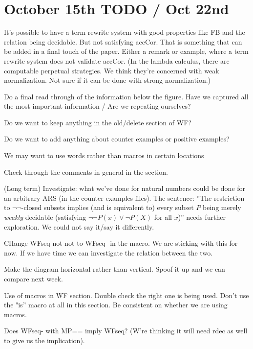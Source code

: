 \documentclass{article}
\newcommand{\cmark}{\ding{51}}%
\newcommand{\done}{\rlap{$\square$}{\raisebox{2pt}{\large\hspace{1pt}\cmark}}%
\hspace{-2.5pt}}
\begin{document}
\section*{October 15th TODO / Oct 22nd}
\begin{todolist}     
  \item It's possible to have a term rewrite system with good properties like FB and the relation being decidable. But not satisfying accCor. That is something that can be added in a final touch of the paper. Either a remark or example, where a term rewrite system does not validate accCor. (In the lambda calculus, there are computable perpetual strategies. We think they're concerned with weak normalization. Not sure if it can be done with strong normalization.)
  \item Do a final read through of the information below the figure. Have we captured all the most important information / Are we repeating ourselves?
  \item [\done] Do we want to keep anything in the old/delete section of WF?
  \item Do we want to add anything about counter examples or positive examples? 
  \item [\done] We may want to use words rather than macros in certain locations
  \item [\done] Check through the comments in general in the section. 
  \item (Long term) Investigate: what we've done for natural numbers could be done for an arbitrary ARS (in the counter examples files). The sentence: ''The restriction to $\lnot\lnot$-closed subsets implies (and is equivalent to) 
every subset $P$ being merely \emph{weakly} decidable (satisfying $\lnot \lnot P(x) \lor \lnot P(X)$ 
for all $x$)'' needs further exploration. We could not say it/say it differently. 
\item [\done]  CHange WFseq not not to WFseq- in the macro. We are sticking with this for now. If we have time we can investigate the relation between the two.
\item [\done]  Make the diagram horizontal rather than vertical. Spoof it up and we can compare next week.
\item [\done]  Use of macros in WF section. Double check the right one is being used. Don't use the "is'' macro at all in this section. Be consistent on whether we are using macros. 
\item Does WFseq- with MP== imply WFseq? (W're thinking it will need rdec as well to give us the implication).

\end{todolist}
\end{document}
